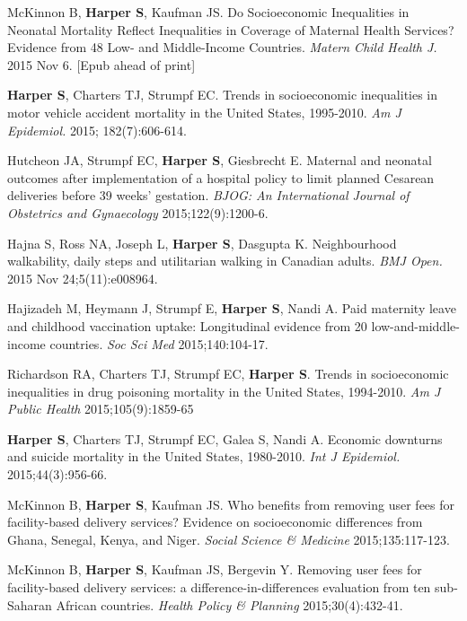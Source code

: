 \documentclass[
  letterpaper,
  DIV=11,
  numbers=noendperiod]{scrartcl}
\begin{document}
\begin{etaremune}
\item *McKinnon B, \textbf{Harper S}, Kaufman JS. Do Socioeconomic Inequalities in Neonatal Mortality Reflect Inequalities in Coverage of Maternal Health Services? Evidence from 48 Low- and Middle-Income Countries. \emph{Matern Child Health J.} 2015 Nov 6. [Epub ahead of print]

\item \textbf{Harper S}, Charters TJ, Strumpf EC. Trends in socioeconomic inequalities in motor vehicle accident mortality in the United States, 1995-2010. \emph{Am J Epidemiol.} 2015; 182(7):606-614.
 
\item Hutcheon JA, Strumpf EC, \textbf{Harper S}, Giesbrecht E. Maternal and neonatal outcomes after implementation of a hospital policy to limit planned Cesarean deliveries before 39 weeks' gestation. \emph{BJOG: An International Journal of Obstetrics and Gynaecology} 2015;122(9):1200-6.
 
\item Hajna S, Ross NA, Joseph L, \textbf{Harper S}, Dasgupta K. Neighbourhood walkability, daily steps and utilitarian walking in Canadian adults. \emph{BMJ Open.} 2015 Nov 24;5(11):e008964.
 
\item *Hajizadeh M, Heymann J, Strumpf E, \textbf{Harper S}, Nandi A. Paid maternity leave and childhood vaccination uptake: Longitudinal evidence from 20 low-and-middle-income countries. \emph{Soc Sci Med} 2015;140:104-17.
 
\item *Richardson RA, Charters TJ, Strumpf EC, \textbf{Harper S}. Trends in socioeconomic inequalities in drug poisoning mortality in the United States, 1994-2010. \emph{Am J Public Health} 2015;105(9):1859-65
 
\item \textbf{Harper S}, Charters TJ, Strumpf EC, Galea S, Nandi A. Economic downturns and suicide mortality in the United States, 1980-2010. \emph{Int J Epidemiol.} 2015;44(3):956-66.
 
\item *McKinnon B, \textbf{Harper S}, Kaufman JS. Who benefits from removing user fees for facility-based delivery services? Evidence on socioeconomic differences from Ghana, Senegal, Kenya, and Niger. \emph{Social Science \& Medicine} 2015;135:117-123.
 
\item *McKinnon B, \textbf{Harper S}, Kaufman JS, Bergevin Y. Removing user fees for facility-based delivery services: a difference-in-differences evaluation from ten sub-Saharan African countries. \emph{Health Policy \& Planning} 2015;30(4):432-41.
 

\end{etaremune}
\end{document}
